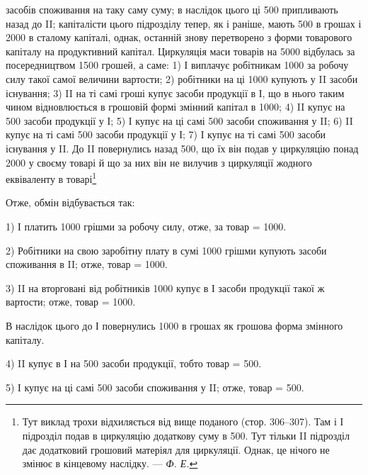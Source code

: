 \parcont{}  %
засобів споживання на таку саму суму; в наслідок цього ці 500
припливають назад до II; капіталісти цього підрозділу тепер, як і раніше,
мають 500 в грошах і 2000 в сталому капіталі,
однак, останній знову перетворено з форми товарового капіталу на продуктивний
капітал. Циркуляція маси товарів на 5000 відбулась
за посередництвом 1500 грошей, а саме: 1) І виплачує робітникам
1000 за робочу силу такої самої величини вартости;
2) робітники на ці 1000 купують у II засоби існування;
3) II на ті самі гроші купує засоби продукції в І, що в нього таким
чином відновлюється в грошовій формі змінний капітал в 1000;
4) II купує на 500 засоби продукції у І;
5) І купує на ці самі 500 засоби споживання у II;
6) II купує на ті самі 500 засоби продукції у І;
7) І купує на ті самі 500 засоби
існування у II. До II повернулись назад 500, що їх він подав у
циркуляцію понад 2000 у своєму товарі й що за них він не
вилучив з циркуляції жодного еквіваленту в товарі\footnote{
Тут виклад трохи відхиляється від вище поданого (стор. 306--307). Там і
І підрозділ подав в циркуляцію додаткову суму в 500. Тут тільки II підрозділ дає
додатковий грошовий матеріял для циркуляції. Однак, це нічого не змінює в
кінцевому наслідку. — \emph{Ф. Е.}}

Отже, обмін відбувається так:

1) І платить 1000 грішми за робочу силу, отже, за товар = 1000.

2) Робітники на свою заробітну плату в сумі 1000 грішми
купують засоби споживання в II; отже, товар = 1000.

3) II на вторговані від робітників 1000 купує в І засоби
продукції такої ж вартости; отже, товар = 1000.

В наслідок цього до І повернулись 1000 в грошах як грошова
форма змінного капіталу.

4) II купує в І на 500 засоби продукції, тобто товар =
500.

5) І купує на ці самі 500 засоби споживання у II; отже,
товар = 500.

